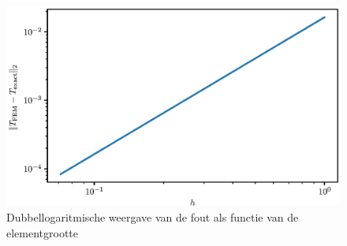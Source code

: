 \documentclass[titlepage]{article}
\begin{document}
\begin{figure}[!htb]
  \centering
  \includegraphics{error}
  \caption{Dubbellogaritmische weergave van de fout als functie van de elementgrootte}
  \label{fig:error-plot}
\end{figure}
\end{document}
